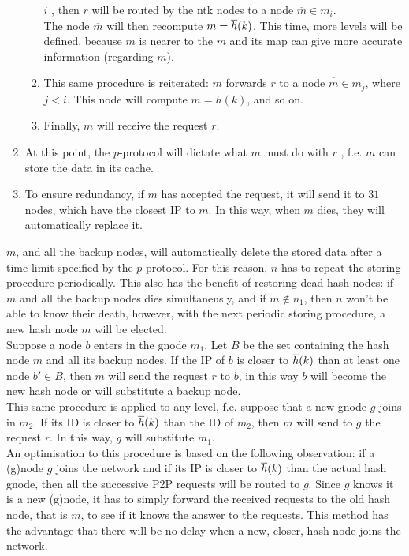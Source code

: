\documentclass[a4paper]{article}
\def\ove#1{{\overline{#1}}}
\theoremstyle{definition}
\begin{document}
\begin{enumerate}
\begin{enumerate}
				$i$ , then $r$ will be routed by the
				ntk nodes to a node $\ove m\in m_i$.\\
				The node $\ove m$ will then recompute $m=\h(k)$.
				This time, more levels will be defined,
				because $\ove m$ is nearer to the $m$ and its
				map can give more accurate information
				(regarding $m$).
			\item This same procedure is reiterated: $\ove m$
				forwards $r$ to a node $\ove {\ove m} \in m_j$,
				where $j<i$. This node will compute $m=h(k)$, and so
				on.
			\item Finally, $m$ will receive the request $r$.
		\end{enumerate}
	\item At this point, the $p$-protocol will dictate what $m$ must do
		with $r$ , f.e. $m$ can store the data in its cache.
	\item To ensure redundancy, if $m$ has accepted the request, it will
		send it to $31$ nodes, which have the closest IP to $m$. 
		In this way, when $m$ dies, they will automatically replace it.
\end{enumerate}
$m$, and all the backup nodes, will automatically delete the stored data
after a time limit specified by the $p$-protocol. For this reason, $n$ has to
repeat the storing procedure periodically. This also has the benefit of
restoring dead hash nodes: if $m$ and all the backup nodes dies simultaneusly,
and if $m\notin n_1$, then $n$ won't be able to know their death, however,
with the next periodic storing procedure, a new hash node $m$ will be elected.\\
\newline
Suppose a node $b$ enters in the gnode $m_1$. Let $B$ be the set containing
the hash node $m$ and all its backup nodes. If the IP of $b$ is closer to
$\h(k)$ than at least one node $b' \in B$, then $m$ will send the request $r$
to $b$, in this way $b$ will become the new hash node or will substitute a
backup node.\\
This same procedure is applied to any level, f.e. suppose that a new gnode $g$
joins in $m_2$. If its ID is closer to $\h(k)$ than the ID of $m_2$, then $m$
will send to $g$ the request $r$. In this way, $g$ will substitute $m_1$.\\
An optimisation to this procedure is based on the following observation: 
if a (g)node $g$ joins the network and if its IP is closer to $\h(k)$ than the
actual hash gnode, then all the successive P2P requests will be
routed to $g$. Since $g$ knows it is a new (g)node, it has to simply forward
the received requests to the old hash node, that is $m$, to see if it knows
the answer to the requests. This method has the advantage that there will be
no delay when a new, closer, hash node joins the network.
\end{document}
